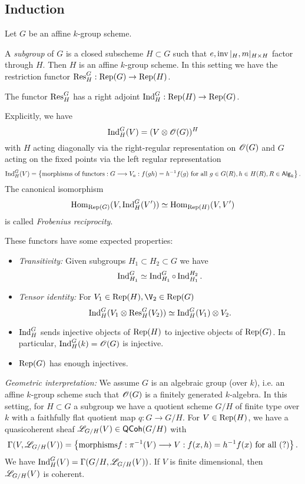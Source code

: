\subsection{Induction} Let $G$ be an affine $k$-group scheme.

A \emph{subgroup} of $G$ is a closed subscheme $H\subset G$ such that $e,\operatorname{inv}|_{H},m|_{H\times H}$ factor through $H$. Then $H$ is an affine $k$-group scheme. In this setting we have the restriction functor $\Res_{H}^{G}:\Rep(G)\to \Rep(H)$.

\begin{proposition}
	The functor $\operatorname{Res}_{H}^{G}$ has a right adjoint $\Ind_{H}^{G}:\Rep(H)\to \Rep(G)$.
\end{proposition}
Explicitly, we have
\[
\operatorname{Ind}_{H}^{G}(V) = (V\otimes\mathscr{O}(G))^H
\] 
with $H$ acting diagonally via the right-regular representation on $\mathscr{O}(G)$ and $G$ acting on the fixed points via the left regular representation
\[
	\Ind_{H}^{G}(V) = \left\{ \text{morphisms of functors}:G\to V_{a}:f(gh)=h^{-1}f(g)\text{ for all }g\in G(R), h\in H(R), R\in \cat{Alg}_k \right\} 
.\] 
The canonical isomorphism
\[
\operatorname{Hom}_{\operatorname{Rep}(G)}(V,\operatorname{Ind}_{H}^{G}(V')) \simeq \operatorname{Hom}_{\operatorname{Rep}(H)}(V,V')
\] 
is called \emph{Frobenius reciprocity}.

These functors have some expected properties:
\begin{itemize}
	\item \emph{Transitivity:} Given subgroups $H_1\subset H_2\subset G$ we have
		\[
		\operatorname{Ind}_{H_1}^{G} \simeq \operatorname{Ind}_{H_1}^{G}\circ \operatorname{Ind}_{H_1}^{H_2}.
		\] 
	\item \emph{Tensor identity:} For $V_1\in \Rep(H),\V_2\in \Rep(G)$ 
		\[
		\operatorname{Ind}_{H}^{G}(V_1\otimes\operatorname{Res}_{H}^{G}(V_2)) \simeq \operatorname{Ind}_{H}^{G}(V_1) \otimes V_2.
		\] 
	\item $\operatorname{Ind}_H^{G}$ sends injective objects of $\operatorname{Rep}(H)$ to injective objects of $\operatorname{Rep}(G)$. In particular, $\operatorname{Ind}_H^{G}(k) = \mathscr{O}(G)$ is injective.
	\item $\operatorname{Rep}(G)$ has enough injectives.
\end{itemize}

\emph{Geometric interpretation:} We assume $G$ is an algebraic group (over $k$), i.e. an affine $k$-group scheme such that $\mathscr{O}(G)$ is a finitely generated $k$-algebra. In this setting, for $H\subset G$ a subgroup we have a quotient scheme $G /H$ of finite type over $k$ with a faithfully flat quotient map $q:G\to G /H$. For $V\in \operatorname{Rep}(H)$, we have a quasicoherent sheaf $\mathscr{L}_{G /H}(V)\in \mathsf{QCoh}(G /H)$ with
\[
\Gamma(V,\CL_{G /H}(V)) = \left\{ \text{morphisms} f:\pi^{-1}(V)\to V : f(x,h)=h^{-1}f(x)\text{ for all }(?)  \right\} 
.\] 
We have $\operatorname{Ind}_{H}^{G}(V) = \Gamma(G /H,\mathscr{L}_{G /H}(V))$. If $V$ is finite dimensional, then $\mathscr{L}_{G /H}(V)$ is coherent.

